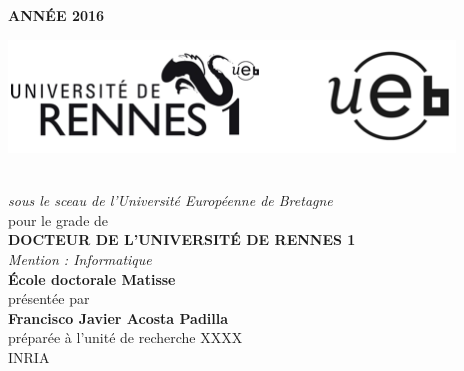 {\selectfont
\thispagestyle{empty}
\begin{minipage}{\textwidth}
\vspace{-7cm}
\hfill
\textbf{ANN\'EE 2016}
\end{minipage}

\vspace{-3.5cm}\hspace{-2cm}
 	\center
\includegraphics[height=30mm]{Logos.png} %

\vspace{.7cm}
\begin{center}
\begin{minipage}{\textwidth}
\\ \vspace{0mm}\emph{\large sous le sceau de l'Universit\'e Europ\'eenne de Bretagne}\\
\vspace{0.5cm}
{\large pour le grade de}\\ \vspace{2mm}
{\Large\bfseries  DOCTEUR DE L'UNIVERSIT\'E DE RENNES 1}\\ \vspace{0.4cm}
\emph{\large Mention : Informatique}\\ \vspace{2mm}
{\Large\bfseries  \'Ecole doctorale Matisse}\\ \vspace{0.5cm}
{\large pr\'esent\'ee par} \\ \vspace{3mm}
{\Huge\bfseries Francisco Javier Acosta Padilla}\\ \vspace{0.6cm}
{\large pr\'epar\'ee \`a l'unit\'e de recherche XXXX\\}
{\large\vspace{0.00cm}INRIA\\}
\end{minipage}
\vspace{0.3cm}


\end{center}}
